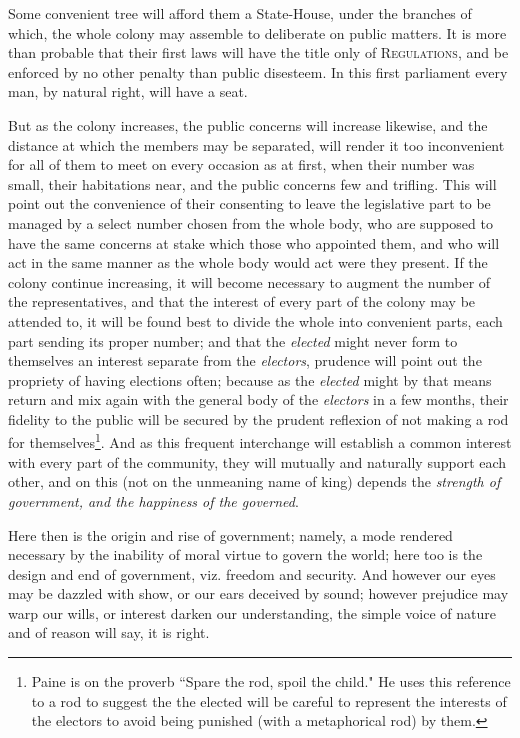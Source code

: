 \documentclass[12pt, twocolumn]{book}
\begin{document}
    Some convenient tree will afford them a State-House, under the branches of which, the whole colony may assemble to deliberate on public matters. It is more than probable that their first laws will have the title only of \textsc{Regulations}, and be enforced by no other penalty than public disesteem. In this first parliament every man, by natural right, will have a seat.

    But as the colony increases, the public concerns will increase likewise, and the distance at which the members may be separated, will render it too inconvenient for all of them to meet on every occasion as at first, when their number was small, their habitations near, and the public concerns few and trifling. This will point out the convenience of their consenting to leave the legislative part to be managed by a select number chosen from the whole body, who are supposed to have the same concerns at stake which those who appointed them, and who will act in the same manner as the whole body would act were they present. If the colony continue increasing, it will become necessary to augment the number of the representatives, and that the interest of every part of the colony may be attended to, it will be found best to divide the whole into convenient parts, each part sending its proper number; and that the \textit{elected} might never form to themselves an interest separate from the \textit{electors}, prudence will point out the propriety of having elections often; because as the \textit{elected} might by that means return and mix again with the general body of the \textit{electors} in a few months, their fidelity to the public will be secured by the prudent reflexion of not making a rod for themselves\footnote{Paine is on the proverb ``Spare the rod, spoil the child." He uses
    this reference to a rod to suggest the the elected will be careful to represent the interests of the electors to avoid being punished (with a
    metaphorical rod) by them.}. And as this frequent interchange will establish a common interest with every part of the community, they will mutually and naturally support each other, and on this (not on the unmeaning name of king) depends the \textit{strength of government, and the happiness of the governed}.

    Here then is the origin and rise of government; namely, a mode rendered necessary by the inability of moral virtue to govern the world; here too is the design and end of government, viz. freedom and security. And however our eyes may be dazzled with show, or our ears deceived by sound; however prejudice may warp our wills, or interest darken our understanding, the simple voice of nature and of reason will say, it is right.
\end{document}
